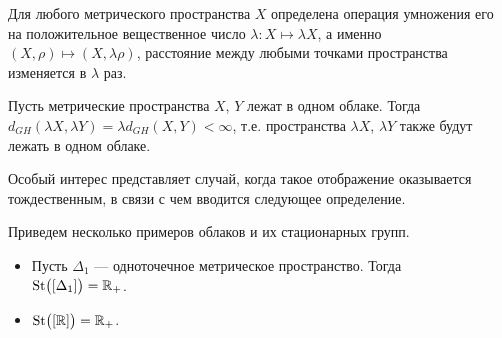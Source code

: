  	 Для любого метрического пространства $X$ определена операция умножения его на положительное вещественное число $\lambda\colon X\mapsto \lambda X$, а именно $(X, \rho) \mapsto (X, \lambda \rho)$, расстояние между любыми точками пространства изменяется в $\lambda$ раз.
 	 \begin{remark}
 	 	Пусть метрические пространства $X$, $Y$ лежат в одном облаке. Тогда $d_{GH}(\lambda X, \lambda Y) = \lambda d_{GH}(X,Y) < \infty$, т.е. пространства $\lambda X$, $\lambda Y$ также будут лежать в одном облаке.
 	 \end{remark} 
 	 Особый интерес представляет случай, когда такое отображение оказывается тождественным, в связи с чем вводится следующее определение.
 	 
 	 Приведем несколько примеров облаков и их стационарных групп.
 	 
 	 \begin{itemize}
 	 	\item Пусть $\Delta_1$ --- одноточечное метрическое пространство. Тогда\\ $\operatorname{St}\bigl([\Delta_1]\bigr) = \mathbb{R}_+$.
 	 	\item $\operatorname{St}\bigl([\mathbb{R}]\bigr) = \mathbb{R}_+ $.
 	 \end{itemize}
 	 
 	 
	